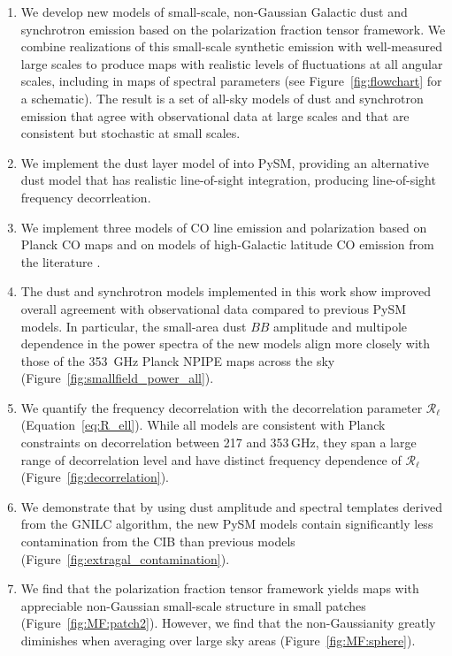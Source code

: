 \documentclass[twocolumn]{aastex631}
\begin{document}
\begin{enumerate}
    \item We develop new models of small-scale, non-Gaussian Galactic dust and synchrotron emission based on the polarization fraction tensor framework. We combine realizations of this small-scale synthetic emission with well-measured large scales to produce maps with realistic levels of fluctuations at all angular scales, including in maps of spectral parameters (see Figure~\ref{fig:flowchart} for a schematic). The result is a set of all-sky models of dust and synchrotron emission that agree with observational data at large scales and that are consistent but stochastic at small scales.
    \item We implement the dust layer model of \citet{Martinez-Solaeche:2018} into PySM, providing an alternative dust model that has realistic line-of-sight integration, producing line-of-sight frequency decorrleation.
    \item We implement three models of CO line emission and polarization based on Planck CO maps \citep{planck2013-p03a} and on models of high-Galactic latitude CO emission from the literature \citep{Puglisi:2017}.
    \item The dust and synchrotron models implemented in this work show improved overall agreement with observational data compared to previous PySM models. In particular, the small-area dust $BB$ amplitude and multipole dependence in the power spectra of the new models align more closely with those of the 353~GHz Planck NPIPE maps across the sky (Figure~\ref{fig:smallfield_power_all}).
    \item We quantify the frequency decorrelation with the decorrelation parameter $\mathcal{R}_\ell$ (Equation~\ref{eq:R_ell}). While all models are consistent with Planck constraints on decorrelation between 217 and 353\,GHz, they span a large range of decorrelation level and have distinct frequency dependence of $\mathcal{R}_\ell$ (Figure~\ref{fig:decorrelation}).
    \item We demonstrate that by using dust amplitude and spectral templates derived from the GNILC algorithm, the new PySM models contain significantly less contamination from the CIB than previous models (Figure~\ref{fig:extragal_contamination}).
    \item We find that the polarization fraction tensor framework yields maps with appreciable non-Gaussian small-scale structure in small patches (Figure~\ref{fig:MF:patch2}). However, we find that the non-Gaussianity greatly diminishes when averaging over large sky areas (Figure~\ref{fig:MF:sphere}).

\end{enumerate}
\end{document}
